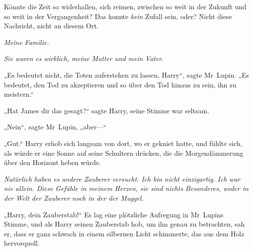 Könnte die Zeit so widerhallen, sich reimen, zwischen so weit in der Zukunft und so weit in der Vergangenheit? Das konnte \emph{kein} Zufall sein, oder? Nicht diese Nachricht, nicht an diesem Ort.

\emph{Meine Familie.}

\emph{Sie waren es wirklich, meine Mutter und mein Vater.}

„Es bedeutet nicht, die Toten auferstehen zu lassen, Harry“, sagte Mr~Lupin. „Es bedeutet, den Tod zu akzeptieren und so über den Tod hinaus zu sein, ihn zu meistern.“

„Hat James dir das gesagt?“ sagte Harry, seine Stimme war seltsam.

„Nein“, sagte Mr~Lupin, „aber—“


„Gut.“ Harry erhob sich langsam von dort, wo er gekniet hatte, und fühlte sich, als würde er eine Sonne auf seine Schultern drücken, die die Morgendämmerung über den Horizont heben würde.

\emph{Natürlich haben es andere Zauberer versucht. Ich bin nicht einzigartig. Ich war nie allein. Diese Gefühle in meinem Herzen, sie sind nichts Besonderes, weder in der Welt der Zauberer noch in der der Muggel}.

„Harry, dein Zauberstab!“ Es lag eine plötzliche Aufregung in Mr~Lupins Stimme, und als Harry seinen Zauberstab hob, um ihn genau zu betrachten, sah er, dass er ganz schwach in einem silbernen Licht schimmerte, das aus dem Holz hervorquoll.

